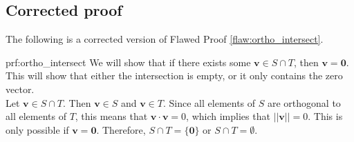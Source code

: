 \clearpage
\subsection{Corrected proof}

The following is a corrected version of Flawed Proof \ref{flaw:ortho_intersect}. %

\begin{prf}{prf:ortho_intersect} %
We will show that if there exists some $\bm{v} \in S \cap T$, then $\bm{v} = \bm{0}$. This will show that either the intersection is empty, or it only contains the zero vector. \\

\noindent Let $\bm{v} \in S \cap T$. Then $\bm{v} \in S$ and $\bm{v} \in T$.  Since all elements of $S$ are orthogonal to all elements of $T$,  this means that $\bm{v} \cdot \bm{v} = 0$, which implies that $||\bm{v}||=0$. This is only possible if $\bm{v} = \bm{0}$. Therefore, $S \cap T = \{\bm{0}\}$ or $S \cap T = \emptyset$.
\end{prf} 